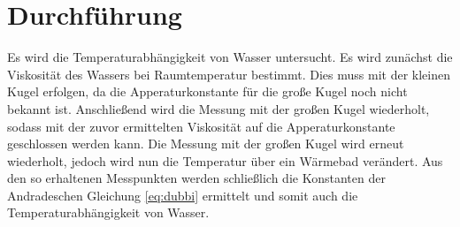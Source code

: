 \section{Durchführung}
\label{sec:Durchführung}
Es wird die Temperaturabhängigkeit von Wasser untersucht.
Es wird zunächst die Viskosität des Wassers bei Raumtemperatur bestimmt. Dies muss mit der kleinen Kugel erfolgen, 
da die Apperaturkonstante für die große Kugel noch nicht bekannt ist. Anschließend wird die Messung mit der großen Kugel
wiederholt, sodass mit der zuvor ermittelten Viskosität auf die Apperaturkonstante geschlossen werden kann.
Die Messung mit der großen Kugel wird erneut wiederholt, jedoch wird nun die Temperatur über ein Wärmebad verändert.
Aus den so erhaltenen Messpunkten werden schließlich die Konstanten der Andradeschen Gleichung \eqref{eq:dubbi} ermittelt 
und somit auch die Temperaturabhängigkeit von Wasser.
